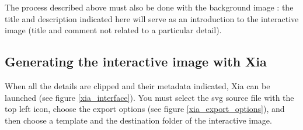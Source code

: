 The process described above must also be done with the background image : 
the title and description indicated here will serve as an introduction to 
the interactive image (title and comment not related to a particular detail).

\subsection{Generating the interactive image with Xia}

When all the details are clipped and their metadata indicated, Xia can be launched (see figure \ref{xia_interface}).
You must select the svg source file with the top left icon,
choose the export options (see figure \ref{xia_export_options}), and then choose a 
template and the destination folder of the interactive image.

